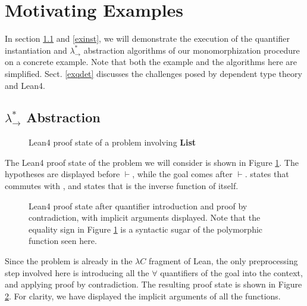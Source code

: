 \section{Motivating Examples} \label{motex}

In section \ref{exabst} and \ref{exinst}, we will demonstrate the execution of the
quantifier instantiation and $\lambda_\to^*$ abstraction algorithms of our monomorphization procedure on a
concrete example. Note that both the example and the algorithms
here are simplified. Sect. \ref{exqdet} discusses the challenges posed by dependent
type theory and Lean4.

\subsection{$\lambda_\to^*$ Abstraction} \label{exabst}

\begin{figure}
  \begin{CenteredBox}
    
  \end{CenteredBox}
  \caption{Lean4 proof state of a problem involving \textbf{List}} \label{leanlistpretty}
\end{figure}

The Lean4 proof state of the problem we will consider is shown in Figure \ref{leanlistpretty}.
The hypotheses are displayed before $\vdash$, while the goal comes after $\vdash$.
\vmaprev states that \vmap commutes with \vrev, and
\vrevrev states that \vrev is the inverse function of itself.

\begin{figure}
  \begin{CenteredBox}
    
  \end{CenteredBox}
  \caption{Lean4 proof state after quantifier introduction and proof by contradiction, with implicit arguments displayed.
    Note that the equality sign in Figure \ref{leanlistpretty} is a syntactic sugar of
    the polymorphic function \vEq seen here.}
  \label{leanlistexplicit}
\end{figure}

Since the problem is already in the $\lambda C$ fragment of Lean, the only
preprocessing step involved here is introducing all the $\forall$ quantifiers
of the goal into the context, and applying proof by contradiction. The resulting proof state
is shown in Figure \ref{leanlistexplicit}.
For clarity, we have displayed the implicit arguments of all the functions.

